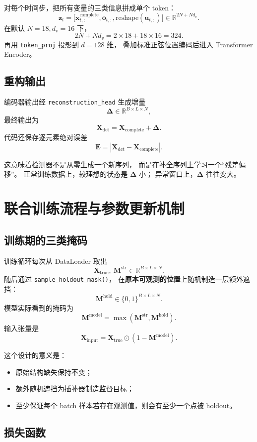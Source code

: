\documentclass[UTF8,11pt,a4paper]{ctexart}
\begin{document}
对每个时间步，把所有变量的三类信息拼成单个 token：
\[
\bm{z}_t=
\big[
\bm{x}^{\mathrm{complete}}_{t,:},
\bm{o}_{t,:},
\mathrm{reshape}(\bm{u}_{t,:})
\big]
\in\mathbb{R}^{2N+Nd_v}.
\]
在默认 $N=18,d_v=16$ 下，
\[
2N+Nd_v=2\times 18 + 18\times 16 = 324.
\]
再用 \texttt{token\_proj} 投影到 $d=128$ 维，
叠加标准正弦位置编码后进入 Transformer Encoder。

\subsection{重构输出}

编码器输出经 \texttt{reconstruction\_head} 生成增量
\[
\bm{\Delta}\in\mathbb{R}^{B\times L\times N},
\]
最终输出为
\[
\bm{X}_{\mathrm{det}}
=
\bm{X}_{\mathrm{complete}}+\bm{\Delta}.
\]
代码还保存逐元素绝对误差
\[
\bm{E}=|\bm{X}_{\mathrm{det}}-\bm{X}_{\mathrm{complete}}|.
\]

这意味着检测器不是从零生成一个新序列，
而是在补全序列上学习一个“残差偏移”。
正常训练数据上，较理想的状态是 $\bm{\Delta}$ 小；
异常窗口上，$\bm{\Delta}$ 往往变大。

\section{联合训练流程与参数更新机制}

\subsection{训练期的三类掩码}

训练循环每次从 DataLoader 取出
\[
\bm{X}_{\mathrm{true}},\ \bm{M}^{\mathrm{str}}
\in\mathbb{R}^{B\times L\times N}.
\]
随后通过 \texttt{sample\_holdout\_mask()}，
在\textbf{原本可观测的位置}上随机制造一层额外遮挡：
\[
\bm{M}^{\mathrm{hold}}\in\{0,1\}^{B\times L\times N}.
\]
模型实际看到的掩码为
\[
\bm{M}^{\mathrm{model}}
=
\max(\bm{M}^{\mathrm{str}},\bm{M}^{\mathrm{hold}}).
\]
输入张量是
\[
\bm{X}_{\mathrm{input}}
=
\bm{X}_{\mathrm{true}}\odot(1-\bm{M}^{\mathrm{model}}).
\]

这个设计的意义是：
\begin{itemize}
  \item 原始结构缺失保持不变；
  \item 额外随机遮挡为插补器制造监督目标；
  \item 至少保证每个 batch 样本若存在观测值，则会有至少一个点被 holdout。
\end{itemize}

\subsection{损失函数}
\end{document}
